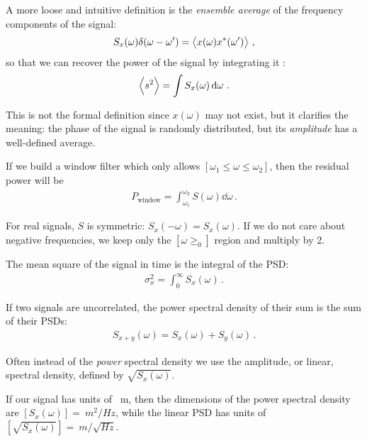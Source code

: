 \documentclass[main.tex]{subfiles}
\begin{document}
A more loose and intuitive definition is the \emph{ensemble average} of the frequency components of the signal: 
%
\begin{align}
S_x(\omega ) \delta (\omega - \omega') = \expval{x(\omega ) x^{*} (\omega')}
\,,
\end{align}
%
so that we can recover the power of the signal by integrating it \cite[eq.\ 7.12]{maggioreGravitationalWavesVolume2007}: 
%
\begin{align}
\expval{s^2} = \int S_x (\omega ) \dd{\omega }
\,.
\end{align}

This is not the formal definition since \(x(\omega )\) may not exist, but it clarifies the meaning: the phase of the signal is randomly distributed, but its \emph{amplitude} has a well-defined average. 


If we build a window filter which only allows \([\omega_1 \leq \omega \leq \omega_2 ]\), then the residual power will be 
%
\begin{align}
P _{\text{window}} = \int_{\omega_1 }^{\omega_2 } S(\omega ) \dd{\omega }
\,.
\end{align}

For real signals, \(S\) is symmetric: \(S_x (-\omega ) = S_x (\omega )\). 
If we do not care about negative frequencies, we keep only the \([\omega \geq_0 ]\) region and multiply by 2.

The mean square of the signal in time is the integral of the PSD: 
%
\begin{align}
\sigma^2_{x} = \int_{0}^{ \infty } S_x (\omega )
\,.
\end{align}

If two signals are uncorrelated, the power spectral density of their sum is the sum of their PSDs: 
%
\begin{align}
S_{x + y} (\omega ) = S_x (\omega ) + S_y (\omega )
\,.
\end{align}
%

Often instead of the \emph{power} spectral density we use the amplitude, or linear, spectral density, defined by \(\sqrt{S_x(\omega )}\). 

If our signal has units of \SI{}{m}, then the dimensions of the power spectral density are \([S_x(\omega )] = \SI{}{m^2/Hz}\), while the linear PSD has units of \([\sqrt{S_x(\omega )}] = \SI{}{m / \sqrt{Hz}}\).
\end{document}
